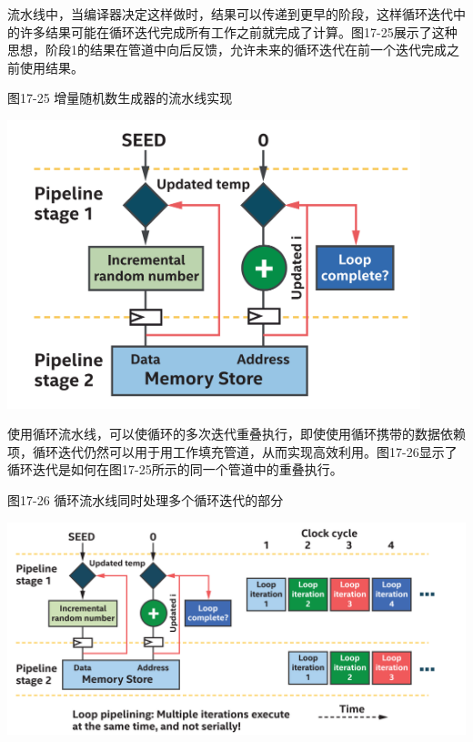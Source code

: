 流水线中，当编译器决定这样做时，结果可以传递到更早的阶段，这样循环迭代中的许多结果可能在循环迭代完成所有工作之前就完成了计算。图17-25展示了这种思想，阶段1的结果在管道中向后反馈，允许未来的循环迭代在前一个迭代完成之前使用结果。\par

\hspace*{\fill} \par %
图17-25 增量随机数生成器的流水线实现
\begin{center}
	\includegraphics[width=0.9\textwidth]{content/chapter-17/images/20}
\end{center}

使用循环流水线，可以使循环的多次迭代重叠执行，即使使用循环携带的数据依赖项，循环迭代仍然可以用于用工作填充管道，从而实现高效利用。图17-26显示了循环迭代是如何在图17-25所示的同一个管道中的重叠执行。\par

\hspace*{\fill} \par %
图17-26 循环流水线同时处理多个循环迭代的部分
\begin{center}
	\includegraphics[width=1.0\textwidth]{content/chapter-17/images/21}
\end{center}

